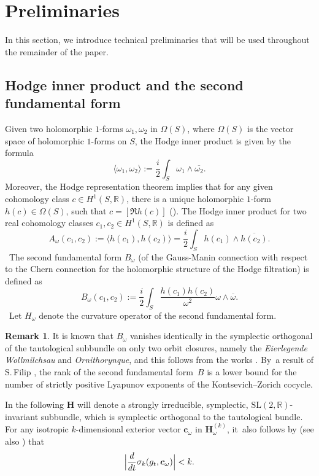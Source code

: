 \documentclass[JEP,XML,SOM,Unicode,published]{cedram}
\theoremstyle{plain}
\theoremstyle{definition}
\newtheorem{rem}[thm]{Remark}
\numberwithin{equation}{subsection}
\newcommand\bR{\mathbb{R}}\let\R\bR
\newcommand{\SL}{\mathrm{SL}}
\newcommand{\bfH}{\boldsymbol{H}}
\newcommand{\bfc}{\boldsymbol{c}}
\begin{document}
\section{Preliminaries}

In this section, we introduce technical preliminaries that will be used throughout the remainder of the paper.

\subsection{Hodge inner product and the second fundamental form}\label{hodgenorm} Given two holomorphic $1$-forms $\omega_1,\omega_2$ in $\Omega(S)$, where $\Omega(S)$ is the vector space of holomorphic $1$-forms on $S$, the Hodge inner product is given by the formula
\[
\langle\omega_1,\omega_2 \rangle := \frac{i}{2}\int_S \omega_1 \wedge \overline{\omega_2}.
\]
Moreover, the Hodge representation theorem implies that for any given cohomology class $c \in H^1(S,\bR)$, there is a unique holomorphic $1$-form $h(c) \in \Omega(S)$, such that $c = [\Re  h(c)]$ (\cf \cite{FMZ12}). The Hodge inner product for two real cohomology classes $c_1,c_2 \in H^1(S,\bR)$
is defined as
\[
A_\omega(c_1,c_2) := \langle h(c_1),h(c_2) \rangle = \frac{i}{2}\int_S h(c_1) \wedge \overline{h(c_2)}.
\]\,
The second fundamental form $B_\omega$ (of the Gauss-Manin connection with respect to the Chern connection for the holomorphic structure of the Hodge filtration) is defined as
\[
B_\omega(c_1,c_2) := \frac{i}{2}\int_S \frac{h(c_1)h(c_2)}{\omega^2} \omega \wedge \overline{\omega}.
\] \,
Let $H_\omega$ denote the curvature operator of the second fundamental form.

\begin{rem}\label{b-vanishing}
It is known that $B_\omega$ vanishes identically in the symplectic orthogonal of the tautological subbundle on only two orbit closures, namely the \emph{Eierlegende Wollmilchsau} and \emph{Ornithorynque}, and this follows from the works \cite{Aul06, EKZ14, Mol05,AN19}. By~a result of S.\,Filip \cite{Fil17}, the rank of the second fundamental form~$B$ is a lower bound for the number of strictly positive Lyapunov exponents of the Kontsevich--Zorich cocycle.
\end{rem}
\sloppy
In the following $\bfH$ will denote a strongly irreducible, symplectic, $\SL(2,\R)$-invariant subbundle, which is symplectic orthogonal to the tautological bundle. For any isotropic $k$-dimensional exterior vector $\bfc_\omega$ in $\bfH^{(k)}_\omega$, it~also follows by \cite{For02} (see also \cite[Cor.\,2.2]{FMZ12}) that
\begin{align}
\Bigl|\frac{d}{dt} \sigma_k(g_t, \bfc_\omega)\Bigr| < k.\label{lipschitzprop}
\end{align}
\end{document}
